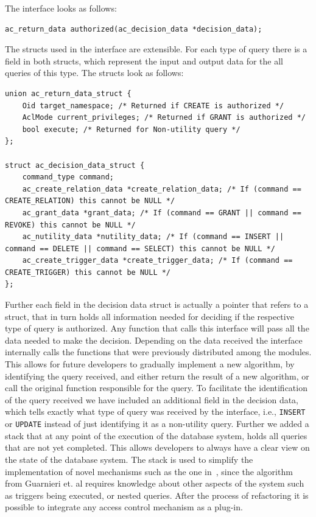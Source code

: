 The interface looks as follows:
%
\begin{lstlisting}[frame=single, style=customc]
ac_return_data authorized(ac_decision_data *decision_data);
\end{lstlisting}
%
The structs used in the interface are extensible. For each type of query there is a field in both structs, which represent the input and output data for the all queries of this type.
%
The structs look as follows:
\begin{lstlisting}[frame=single, style=customc]
union ac_return_data_struct {
	Oid target_namespace; /* Returned if CREATE is authorized */
	AclMode current_privileges; /* Returned if GRANT is authorized */
	bool execute; /* Returned for Non-utility query */
};

struct ac_decision_data_struct {
	command_type command;
	ac_create_relation_data *create_relation_data; /* If (command == CREATE_RELATION) this cannot be NULL */
	ac_grant_data *grant_data; /* If (command == GRANT || command == REVOKE) this cannot be NULL */
	ac_nutility_data *nutility_data; /* If (command == INSERT || command == DELETE || command == SELECT) this cannot be NULL */
	ac_create_trigger_data *create_trigger_data; /* If (command == CREATE_TRIGGER) this cannot be NULL */
};
\end{lstlisting}
%
Further each field in the decision data struct is actually a pointer that refers to a struct, that in turn holds all information needed for deciding if the respective type of query is authorized.
%
Any function that calls this interface will pass all the data needed to make the decision.
%
Depending on the data received the interface internally calls the functions that were previously distributed among the modules.
%
This allows for future developers to gradually implement a new algorithm, by identifying the query received, and either return the result of a new algorithm, or call the original function responsible for the query.
%
To facilitate the identification of the query received we have included an additional field in the decision data, which tells exactly what type of query was received by the interface, i.e., \texttt{INSERT} or \texttt{UPDATE} instead of just identifying it as a non-utility query.
%
Further we added a stack that at any point of the execution of the database system, holds all queries that are not yet completed.
%
This allows developers to always have a clear view on the state of the database system.
%
The stack is used to simplify the implementation of novel mechanisms such as the one in~\cite{guarnieri2016strong}, since the algorithm from Guarnieri et. al requires knowledge about other aspects of the system such as triggers being executed, or nested queries.
%
After the process of refactoring it is possible to integrate any access control mechanism as a plug-in.